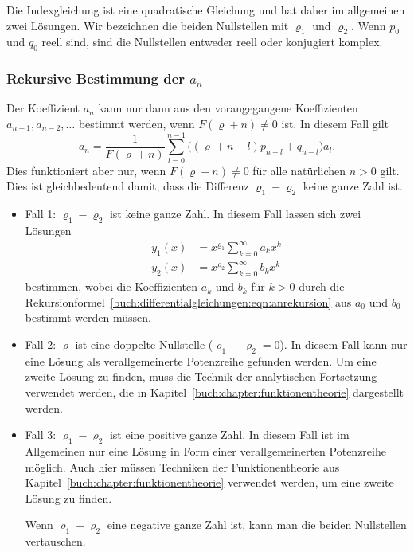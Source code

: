 Die Indexgleichung ist eine quadratische Gleichung und hat daher
im allgemeinen zwei Lösungen.
Wir bezeichnen die beiden Nullstellen mit $\varrho_1$ und $\varrho_2$.
Wenn $p_0$ und $q_0$ reell sind, sind die Nullstellen entweder reell
oder konjugiert komplex.

%
%
\subsubsection{Rekursive Bestimmung der $a_n$}
Der Koeffizient $a_{n}$ kann nur dann aus den vorangegangene
Koeffizienten $a_{n-1},a_{n-2},\dots$ bestimmt werden, wenn
$F(\varrho+n)\ne 0$ ist.
In diesem Fall gilt
\begin{equation}
a_n
=
\frac{1}{F(\varrho+n)}
\sum_{l=0}^{n-1}\bigl( (\varrho+n-l)p_{n-l} + q_{n-l}\bigr)a_l.
\label{buch:differentialgleichungen:eqn:anrekursion}
\end{equation}
Dies funktioniert aber nur, wenn $F(\varrho+n)\ne 0$ für alle
natürlichen $n > 0$ gilt.
Dies ist gleichbedeutend damit, dass die Differenz $\varrho_1-\varrho_2$
keine ganze Zahl ist.

\begin{itemize}
\item
Fall 1: $\varrho_1-\varrho_2$ ist keine ganze Zahl.
In diesem Fall lassen sich zwei Lösungen
\begin{align*}
y_1(x) &= x^{\varrho_1}\sum_{k=0}^\infty a_k x^k
\\
y_2(x) &= x^{\varrho_2}\sum_{k=0}^\infty b_k x^k
\end{align*}
bestimmen, wobei die Koeffizienten $a_k$ und $b_k$ für $k>0$ durch
die Rekursionformel~\eqref{buch:differentialgleichungen:eqn:anrekursion}
aus $a_0$ und $b_0$ bestimmt werden müssen.

\item
Fall 2: $\varrho$ ist eine doppelte Nullstelle ($\varrho_1-\varrho_2=0$).
In diesem Fall kann nur eine Lösung als verallgemeinerte Potenzreihe
gefunden werden.
Um eine zweite Lösung zu finden, muss die Technik der analytischen
Fortsetzung verwendet werden, die in
Kapitel~\ref{buch:chapter:funktionentheorie}
dargestellt werden.

\item
Fall 3: $\varrho_1-\varrho_2$ ist eine positive ganze Zahl.
In diesem Fall ist im Allgemeinen nur eine Lösung in Form einer
verallgemeinerten Potenzreihe möglich.
Auch hier müssen Techniken der Funktionentheorie aus
Kapitel~\ref{buch:chapter:funktionentheorie}
verwendet werden, um eine zweite Lösung zu finden.

Wenn $\varrho_1-\varrho_2$ eine negative ganze Zahl ist, kann man die
beiden Nullstellen vertauschen.
\end{itemize}






